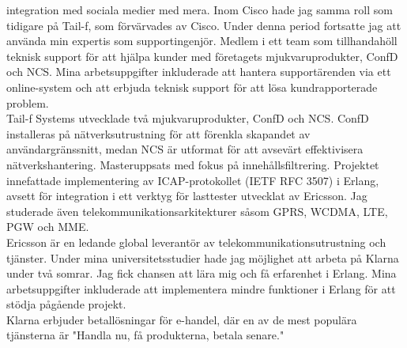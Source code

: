 \documentclass[purpleprocv]{procv}
\begin{document}
\begin{procv-twocolumns}
{{          integration med sociala medier med mera.}
          {Inom Cisco hade jag samma roll som tidigare på Tail-f, som förvärvades av Cisco. 
          Under denna period fortsatte jag att använda min expertis som supportingenjör.}
          {Medlem i ett team som tillhandahöll teknisk support för att hjälpa kunder med företagets 
          mjukvaruprodukter, ConfD och NCS. Mina arbetsuppgifter inkluderade att hantera 
          supportärenden via ett online-system och att erbjuda teknisk support för 
          att lösa kundrapporterade problem.
          \\[3pt]
          Tail-f Systems utvecklade två mjukvaruprodukter, ConfD och NCS. ConfD installeras 
          på nätverksutrustning för att förenkla skapandet av användargränssnitt, medan NCS är 
          utformat för att avsevärt effektivisera nätverkshantering.}
          {Masteruppsats med fokus på innehållsfiltrering. Projektet innefattade implementering 
          av ICAP-protokollet (IETF RFC 3507) i Erlang, avsett för integration i ett 
          verktyg för lasttester utvecklat av Ericsson. Jag studerade även 
          telekommunikationsarkitekturer såsom GPRS, WCDMA, LTE, PGW och MME.
          \\[3pt]
          Ericsson är en ledande global leverantör av telekommunikationsutrustning och tjänster.}
          {Under mina universitetsstudier hade jag möjlighet att arbeta på Klarna under två 
          somrar. Jag fick chansen att lära mig och få erfarenhet i Erlang. Mina 
          arbetsuppgifter inkluderade att implementera mindre funktioner i Erlang för att 
          stödja pågående projekt. 
          \\[3pt]
          Klarna erbjuder betallösningar för e-handel, där en av de mest populära tjänsterna 
          är "Handla nu, få produkterna, betala senare."}
        }
\end{procv-twocolumns}
\end{document}
